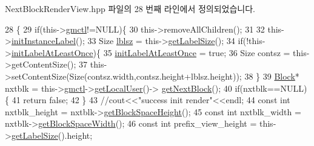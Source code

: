 Next\+Block\+Render\+View.\+hpp 파일의 28 번째 라인에서 정의되었습니다.


\begin{DoxyCode}
28                                   \{
29                 \textcolor{keywordflow}{if}(this->\hyperlink{class_tetris_1_1_views_1_1_next_block_render_behavior_a63b273270f67d15da4d2c16452a0000e}{gmctl}!=NULL)\{
30                     this->removeAllChildren();
31                     
32                     this->\hyperlink{class_tetris_1_1_views_1_1_next_block_render_behavior_a71f46d8714e29a672ae20b0af5f4db2e}{initInstanceLabel}();
33                     Size \hyperlink{class_tetris_1_1_views_1_1_next_block_render_behavior_aa87ada3fdc0e7e5c3bfb98e123d9825f}{lblsz} = this->\hyperlink{class_tetris_1_1_views_1_1_next_block_render_behavior_a5eb782a4171baf98f967d5a048cfe243}{getLabelSize}();
34                     \textcolor{keywordflow}{if}(!this->\hyperlink{class_tetris_1_1_views_1_1_next_block_render_behavior_ab0185d337e0b137ed985aeebef5f3b43}{initLabelAtLeastOnce})\{
35                         \hyperlink{class_tetris_1_1_views_1_1_next_block_render_behavior_ab0185d337e0b137ed985aeebef5f3b43}{initLabelAtLeastOnce} = \textcolor{keyword}{true};
36                         Size contsz = this->getContentSize();
37                         this->setContentSize(Size(contsz.width,contsz.height+lblsz.height));
38                     \}
39                     \hyperlink{class_tetris_1_1_block}{Block}* nxtblk = this->\hyperlink{class_tetris_1_1_views_1_1_next_block_render_behavior_a63b273270f67d15da4d2c16452a0000e}{gmctl}->\hyperlink{class_tetris_1_1_game_controller_abc67d4b309ce2886b43a3b4e0af22abc}{getLocalUser}()->
      \hyperlink{class_tetris_1_1_users_1_1_game_user_a9300608a38f8a3b10f9d6b6bdaeaab18}{getNextBlock}();
40                     \textcolor{keywordflow}{if}(nxtblk==NULL)\{
41                         \textcolor{keywordflow}{return} \textcolor{keyword}{false};
42                     \}
43                     \textcolor{comment}{//cout<<"success init render"<<endl;}
44                     \textcolor{keyword}{const} \textcolor{keywordtype}{int} nxtblk\_height = nxtblk->\hyperlink{class_tetris_1_1_block_a5301977e32c03aaf122fa289fcba77ba}{getBlockSpaceHeight}();
45                     \textcolor{keyword}{const} \textcolor{keywordtype}{int} nxtblk\_width = nxtblk->\hyperlink{class_tetris_1_1_block_ac390e14de476582300d815d9054ed9bd}{getBlockSpaceWidth}();
46                     \textcolor{keyword}{const} \textcolor{keywordtype}{int} prefix\_view\_height = this->\hyperlink{class_tetris_1_1_views_1_1_next_block_render_behavior_a5eb782a4171baf98f967d5a048cfe243}{getLabelSize}().height;

\end{DoxyCode}
